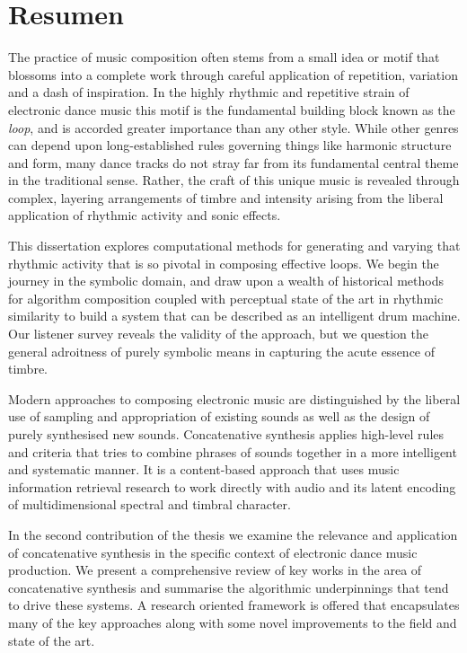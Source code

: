 
\chapter{Resumen}

The practice of music composition often stems from a small idea or motif that blossoms into a complete work through careful application of repetition, variation and a dash of inspiration. In the highly rhythmic and repetitive strain of electronic dance music this motif is the fundamental building block known as the \textit{loop}, and is accorded greater importance than any other style. While other genres can depend upon long-established rules governing things like harmonic structure and form, many dance tracks do not stray far from its fundamental central theme in the traditional sense. Rather, the craft of this unique music is revealed through complex, layering arrangements of timbre and intensity arising from the liberal application of rhythmic activity and sonic effects.

This dissertation explores computational methods for generating and varying that rhythmic activity that is so pivotal in composing effective loops. We begin the journey in the symbolic domain, and draw upon a wealth of historical methods for algorithm composition coupled with perceptual state of the art in rhythmic similarity to build a system that can be described as an intelligent drum machine. Our listener survey reveals the validity of the approach, but we question the general adroitness of purely symbolic means in capturing the acute essence of timbre.

Modern approaches to composing electronic music are distinguished by the liberal use of sampling and appropriation of existing sounds as well as the design of purely synthesised new sounds. Concatenative synthesis applies high-level rules and criteria that tries to combine phrases of sounds together in a more intelligent and systematic manner. It is a  content-based approach that uses music information retrieval research to work directly with audio and its latent encoding of multidimensional spectral and timbral character.

In the second contribution of the thesis we examine the relevance and application of concatenative synthesis in the specific context of electronic dance music production. We present a comprehensive review of key works in the area of concatenative synthesis and summarise the algorithmic underpinnings that tend to drive these systems. A research oriented framework is offered that encapsulates many of the key approaches along with some novel improvements to the field and state of the art.

